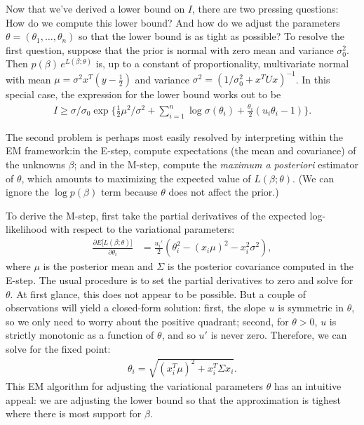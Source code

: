 \documentclass[final]{siamltex}
\newcommand{\smfrac}[2]{{\textstyle\frac{#1}{#2}}}
\newcommand{\half}{{\textstyle\frac{1}{2}}}
\newcommand{\lb}{\bm{[}}
\newcommand{\rb}{\bm{]}}
\begin{document}
Now that we've derived a lower bound on $I$, there are two pressing
questions: How do we compute this lower bound? And how do we adjust
the parameters $\theta = (\theta_1, \ldots, \theta_n)$ so that the
lower bound is as tight as possible? To resolve the first question,
suppose that the prior is normal with zero mean and variance
$\sigma_0^2$. Then $p(\beta) \, e^{L(\beta; \theta)}$ is, up to a
constant of proportionality, multivariate normal with mean $\mu =
\sigma^2 x^T(y - \half)$ and variance $\sigma^2 = (1/\sigma_0^2 +
x^TUx)^{-1}$. In this special case, the expression for the lower bound
works out to be
\begin{align*}
I \geq \sigma/\sigma_0
\exp\Big\{ \half \mu^2/\sigma^2 + 
{\textstyle \sum_{i=1}^n \log\sigma(\theta_i) + 
\smfrac{\theta_i}{2}(u_i\theta_i - 1)}\Big\}.
\end{align*}

The second problem is perhaps most easily resolved by interpreting
within the EM framework:in the E-step, compute expectations (the mean
and covariance) of the unknowns $\beta$; and in the M-step, compute
the {\em maximum a posteriori} estimator of $\theta$, which amounts to
maximizing the expected value of $L(\beta; \theta)$. (We can ignore
the $\log p(\beta)$ term because $\theta$ does not affect the prior.)

To derive the M-step, first take the partial derivatives of the
expected log-likelihood with respect to the variational parameters:
\begin{align*}
\frac{\partial E\lb L(\beta;\theta)\rb}{\partial \theta_i} &=
\frac{u_i'}{2}(\theta_i^2 - (x_i\mu)^2 - x_i^2\sigma^2),
\end{align*}
where $\mu$ is the posterior mean and $\Sigma$ is the posterior
covariance computed in the E-step. The usual procedure is to set the
partial derivatives to zero and solve for $\theta$. At first glance,
this does not appear to be possible. But a couple of observations will
yield a closed-form solution: first, the slope $u$ is symmetric in
$\theta$, so we only need to worry about the positive quadrant;
second, for $\theta > 0$, $u$ is strictly monotonic as a function of
$\theta$, and so $u'$ is never zero. Therefore, we can solve for the
fixed point:
\begin{align*}
\theta_i = \sqrt{(x_i^T\mu)^2 + x_i^T \Sigma x_i}.
\end{align*}
This EM algorithm for adjusting the variational parameters $\theta$
has an intuitive appeal: we are adjusting the lower bound so that the
approximation is tighest where there is most support for $\beta$.
  
\end{document}
